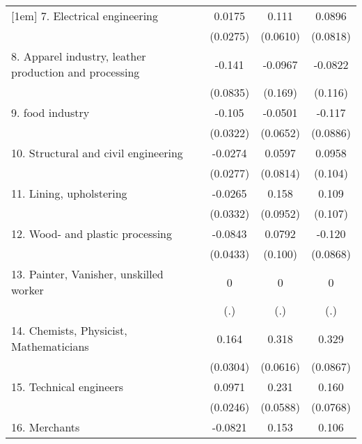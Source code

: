 {\begin{tabular}{l*{3}{c}}
[1em]
7.  Electrical engineering&      0.0175         &       0.111         &      0.0896         \\
                    &    (0.0275)         &    (0.0610)         &    (0.0818)         \\
[1em]
8. Apparel industry, leather production and processing&      -0.141         &     -0.0967         &     -0.0822         \\
                    &    (0.0835)         &     (0.169)         &     (0.116)         \\
[1em]
9. food industry    &      -0.105\sym{**} &     -0.0501         &      -0.117         \\
                    &    (0.0322)         &    (0.0652)         &    (0.0886)         \\
[1em]
10. Structural and civil engineering&     -0.0274         &      0.0597         &      0.0958         \\
                    &    (0.0277)         &    (0.0814)         &     (0.104)         \\
[1em]
11. Lining, upholstering&     -0.0265         &       0.158         &       0.109         \\
                    &    (0.0332)         &    (0.0952)         &     (0.107)         \\
[1em]
12. Wood- and plastic processing&     -0.0843         &      0.0792         &      -0.120         \\
                    &    (0.0433)         &     (0.100)         &    (0.0868)         \\
[1em]
13. Painter, Vanisher, unskilled worker&           0         &           0         &           0         \\
                    &         (.)         &         (.)         &         (.)         \\
[1em]
14. Chemists, Physicist, Mathematicians&       0.164\sym{***}&       0.318\sym{***}&       0.329\sym{***}\\
                    &    (0.0304)         &    (0.0616)         &    (0.0867)         \\
[1em]
15. Technical engineers&      0.0971\sym{***}&       0.231\sym{***}&       0.160\sym{*}  \\
                    &    (0.0246)         &    (0.0588)         &    (0.0768)         \\
[1em]
16. Merchants       &     -0.0821\sym{**} &       0.153\sym{*}  &       0.106         \\

\end{tabular}}
